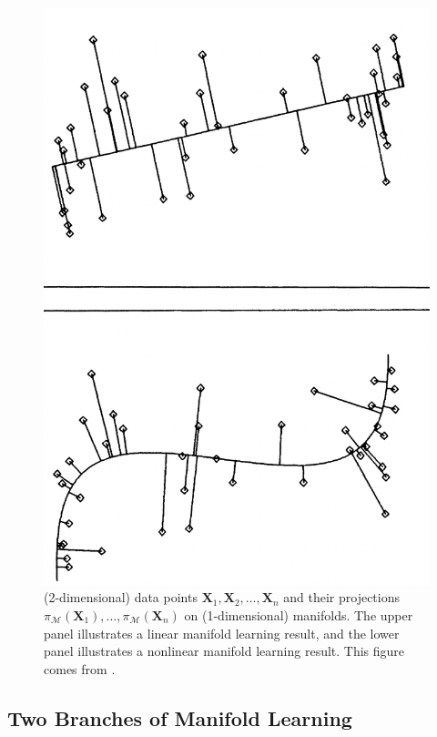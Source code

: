 \documentclass[11pt,letterpaper, leqno]{article}
\numberwithin{equation}{section}
\numberwithin{theorem}{section}
\numberwithin{lemma}{section}
\numberwithin{corollary}{section}
\numberwithin{definition}{section}
\numberwithin{proposition}{section}
\numberwithin{remark}{section}
\numberwithin{example}{section}
\begin{document}
\begin{figure}[h]
    \centering
    \includegraphics[scale=0.3]{Porjections from HS.pdf}
    \caption{(2-dimensional) data points $\boldsymbol{X}_1, \boldsymbol{X}_2, \ldots, \boldsymbol{X}_n$ and their projections $\pi_{\mathcal{M}}(\boldsymbol{X}_1), \ldots, \pi_{\mathcal{M}}(\boldsymbol{X}_n)$ on (1-dimensional) manifolds. The upper panel illustrates a linear manifold learning result, and the lower panel illustrates a nonlinear manifold learning result. This figure comes from \cite{hastie1989principal}.}
    \label{fig: Porjections from HS}
\end{figure}

\subsection{Two Branches of Manifold Learning}
\end{document}
